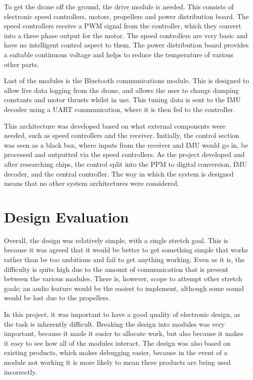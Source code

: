 \documentclass[a4paper]{article}
\begin{document}
To get the drone off the ground, the drive module is needed. This consists of electronic speed controllers, motors, propellers and power distribution board. The speed controllers receive a PWM signal from the controller, which they convert into a three phase output for the motor. The speed controllers are very basic and have no intelligent control aspect to them. The power distribution board provides a suitable continuous voltage and helps to reduce the temperature of various other parts.

Last of the modules is the Bluetooth communications module. This is designed to allow live data logging from the drone, and allows the user to change damping constants and motor thrusts whilst in use. This tuning data is sent to the IMU decoder using a UART communication, where it is then fed to the controller.

This architecture was developed based on what external components were needed, such as speed controllers and the receiver. Initially, the control section was seen as a black box, where inputs from the receiver and IMU would go in, be processed and outputted via the speed controllers. As the project developed and after researching chips, the control split into the PPM to digital conversion, IMU decoder, and the central controller. The way in which the system is designed means that no other system architectures were considered.

\section{Design Evaluation}

Overall, the design was relatively simple, with a single stretch goal. This is because it was agreed that it would be better to get something simple that works rather than be too ambitious and fail to get anything working. Even as it is, the difficulty is quite high due to the amount of communication that is present between the various modules. There is, however, scope to attempt other stretch goals; an audio feature would be the easiest to implement, although some sound would be lost due to the propellers.

In this project, it was important to have a good quality of electronic design, as the task is inherently difficult. Breaking the design into modules was very important, because it made it easier to allocate work, but also because it makes it easy to see how all of the modules interact. The design was also based on existing products, which makes debugging easier, because in the event of a module not working it is more likely to mean these products are being used incorrectly.
\end{document}
